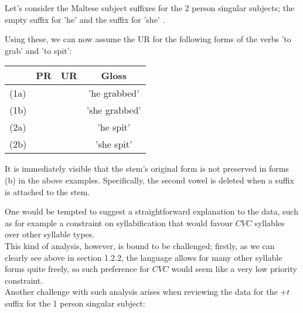 \documentclass[11pt,draft]{article}
\begin{document}
Let's consider the Maltese subject suffixes for the 2 person singular subjects; the empty suffix \textipa{+\O} for 'he' and the suffix  for 'she' \cite{brame1974}.

Using these, we can now assume the UR for the following forms of the verbs  'to grab' and  'to spit':

\begin{table}[htdp]
\begin{tabularx}{400pt}{|l| C | C | C|}
	\hline
	&
	PR &
	UR &
	Gloss \\\hline\hline
	
	(1a) &
	 &
	 &
	'he grabbed' \\
	
	(1b) &
	 &
	 &
	'she grabbed' \\
	
	\hline
	
	(2a) &
	 &
	 &
	'he spit' \\
	
	(2b) &
	 &
	 &
	'she spit' \\
	
	\hline
	
\end{tabularx}
\end{table}

It is immediately visible that the stem's original form is not preserved in forms (b) in the above examples. Specifically, the second vowel is deleted when a suffix is attached to the stem.

One would be tempted to suggest a straightforward explanation to the data, such as for example a constraint on syllabification that would favour $CVC$ syllables over other syllable types.
\\

This kind of analysis, however, is bound to be challenged; firstly, as we can clearly see above in section 1.2.2, the language allows for many other syllable forms quite freely, so such preference for $CVC$ would seem like a very low priority constraint.
\\

Another challenge with such analysis arises when reviewing the data for the $+t$ suffix for the 1 person singular subject:
\end{document}
